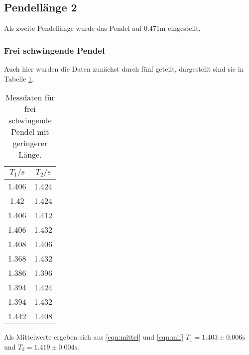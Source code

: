 

\subsection{Pendellänge 2}
Als zweite Pendellänge wurde das Pendel auf $0.471 \si{\m}$ eingestellt.
\subsubsection{Frei schwingende Pendel}
Auch hier wurden die Daten zunächst durch fünf geteilt, dargestellt
sind sie in Tabelle \ref{tab:frei2}. 
\begin{table}
    \centering
    \caption{Messdaten für frei schwingende Pendel mit geringerer Länge.}
    \label{tab:frei2}
    \begin{tabular}{c c}
     \toprule
     $T_1 / \si{\s}$ & $T_2 / \si{\s}$\\
     \midrule
     1.406 & 1.424 \\
     1.42 & 1.424 \\
     1.406 & 1.412 \\
     1.406 & 1.432\\
     1.408 & 1.406 \\
     1.368 & 1.432 \\
     1.386 & 1.396 \\
     1.394 & 1.424 \\
     1.394 & 1.432 \\
     1.442 & 1.408 \\
     \bottomrule
    \end{tabular}
\end{table}
Als Mittelwerte ergeben sich aus \eqref{eqn:mittel} und \eqref{eqn:mif} $T_1 = 1.403\pm 0.006 \si{\s}$ und $T_2 = 1.419\pm 0.004 \si{\s}$.

